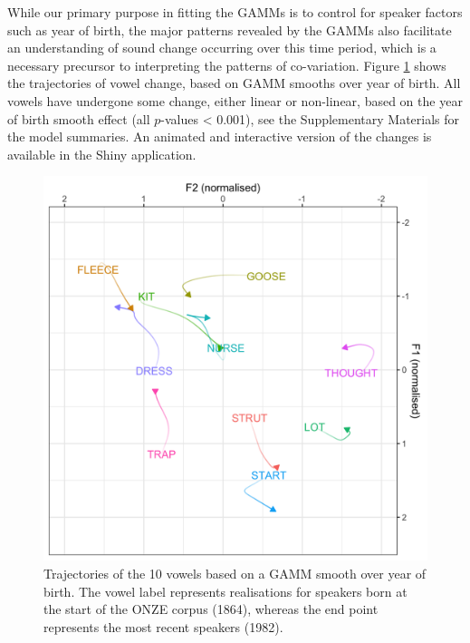 \documentclass[review]{elsarticle} %
\begin{document}
While our primary purpose in fitting the GAMMs is to control for speaker factors such as year of birth, the major patterns revealed by the GAMMs also facilitate an understanding of sound change occurring over this time period, which is a necessary precursor to interpreting the patterns of co-variation. Figure \ref{fig:sound_change} shows the trajectories of vowel change, based on GAMM smooths over year of birth.  All vowels have undergone some change, either linear or non-linear, based on the year of birth smooth effect (all $p$-values < 0.001), see the Supplementary Materials for the model summaries.  An animated and interactive version of the changes is available in the Shiny application.


\begin{figure}[!t]
\includegraphics[width=\textwidth]{Figures/sound_change_static.png}
\caption{Trajectories of the 10 vowels based on a GAMM smooth over year of birth. The vowel label represents realisations for speakers born at the start of the ONZE corpus (1864), whereas the end point represents the most recent speakers (1982).}
\label{fig:sound_change}
\end{figure}
\end{document}
